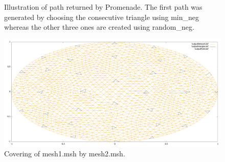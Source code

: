 \documentclass[10pt]{article}
\begin{document}
	\begin{figure}[h]
		\label{path}
		\caption{ Illustration of path returned by Promenade. The first path was generated by choosing the consecutive triangle using {\ttfamily min\_neg} whereas the other three ones are created using {\ttfamily random\_neg}.}
	\end{figure}
	
	\begin{figure}
		\centering
		\includegraphics[width=0.55\linewidth,height=0.55\linewidth]{../Figures/CoveringTriangles.png}
		\caption{Covering of mesh1.msh by mesh2.msh.}
		\label{coveringTri}
	\end{figure}
	
\end{document}
